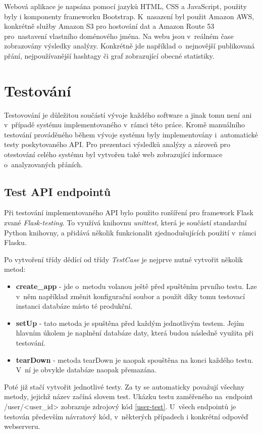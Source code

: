 \documentclass[thesis=B,czech]{FITthesis}[2012/06/26]
\begin{document}
	Webová aplikace je napsána pomocí jazyků HTML, CSS a JavaScript, použity byly i komponenty frameworku Bootstrap. K~nasazení byl použit Amazon AWS, konkrétně služby Amazon S3 pro hostování dat a Amazon Route 53 pro~nastavení vlastního doménového jména. Na webu jsou v~reálném čase zobrazovány výsledky analýzy. Konkrétně jde například o~nejnovější publikovaná přání, nejpoužívanější hashtagy či graf zobrazující obecné statistiky. 


\chapter{Testování}
\label{testovani}
Testovování je důležitou součástí vývoje každého software a jinak tomu není ani v~případě systému implementovaného v~rámci této práce. Kromě manuálního testování prováděného během vývoje systému byly implementovány i~automatické testy poskytovaného API. Pro prezentaci výsledků analýzy a zároveň pro otestování celého systému byl vytvořen také web zobrazující informace o~analyzovaných přáních. 


\section{Test API endpointů}
\label{api-testing}
Při testování implementovaného API bylo použito rozšíření pro framework Flask zvané \textit{Flask-testing}. To využívá knihovnu \textit{unittest}, která je součástí standardní Python knihovny, a přidává několik funkcionalit zjednodušujících použití v~rámci Flasku. 

Po vytvoření třídy dědící od třídy \textit{TestCase} je nejprve nutné vytvořit několik metod:

\begin{itemize}
\item \textbf{create\_app} - jde o~metodu volanou ještě před spuštěním prvního testu. Lze v~něm například změnit konfigurační soubor a použít díky tomu testovací instanci databáze místo té produkční. 
\item \textbf{setUp} - tato metoda je spuštěna před každým jednotlivým testem. Jejím hlavním úkolem je naplnění databáze daty, která budou následně využita při testování. 
\item \textbf{tearDown} - metoda tearDown je naopak spouštěna na konci každého testu. V~ní je obvykle databáze naopak přemazána. 
\end{itemize}

Poté již stačí vytvořit jednotlivé testy. Za ty se automaticky považují všechny metody, jejichž název začíná slovem test. Ukázku testu zaměřeného na~endpoint /user/<user\_id> zobrazuje zdrojový kód \ref{user-test}. U~všech endpointů je testován především návratový kód, v~některých případech i konkrétní odpověď webserveru. 
\end{document}
